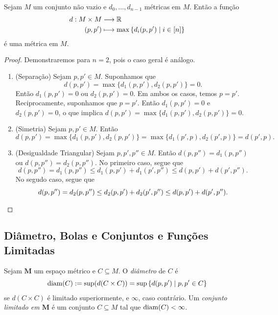 \begin{prop}
Sejam $M$ um conjunto não vazio e $d_0, \ldots,d_{n-1}$ métricas em $M$. Então a função
	\begin{align*}
	{d}: {M \times M} &\longrightarrow {\mathbb{R}} \\{(p,p')} &\longmapsto {\max\left\{d_i(p,p') \;\middle\vert\; i \in [n] \right\}}
	\end{align*}
é uma métrica em $M$.
\end{prop}
\begin{proof}
Demonstraremos para $n=2$, pois o caso geral é análogo.
	\begin{enumerate}
	\item (Separação) Sejam $p,p' \in M$. Suponhamos que
	\begin{equation*}
	d(p,p')=\max\{d_1(p,p'),d_2(p,p')\}=0.
	\end{equation*}
Então $d_1(p,p')=0$ ou $d_2(p,p')=0$. Em ambos os casos, temos $p=p'$. Reciprocamente, suponhamos que $p=p'$. Então $d_1(p,p')=0$ e $d_2(p,p')=0$, o que implica $d(p,p')=\max\{d_1(p,p'),d_2(p,p')\}=0$.
	
	\item (Simetria) Sejam $p,p' \in M$. Então
	\begin{equation*}
	d(p,p') = \max\{d_1(p,p'),d_2(p,p')\} = \max\{d_1(p',p),d_2(p',p)\} = d(p',p).
	\end{equation*}
	
	\item (Desigualdade Triangular) Sejam $p,p',p'' \in M$. Então $d(p,p'')=d_1(p,p'')$ ou $d(p,p'')=d_2(p,p'')$. No primeiro caso, segue que
	\begin{equation*}
	d(p,p'') = d_1(p,p'') \leq d_1(p,p') + d_1(p',p'') \leq d(p,p') + d(p',p'').
	\end{equation*}
	No segudo caso, segue que
	\begin{equation*}
	d(p,p'') = d_2(p,p'') \leq d_2(p,p') + d_2(p',p'') \leq d(p,p') + d(p',p''). \qedhere
	\end{equation*}
	\end{enumerate}
\end{proof}

\subsection{Diâmetro, Bolas e Conjuntos e Funções Limitadas}

\begin{defi}
Sejam $\bm M$ um espaço métrico e $C \subseteq M$. O \emph{diâmetro} de $C$ é
	\begin{equation*}
	\operatorname{diam}(C) := \sup(d(C \times C)) = \sup\left\{d(p,p') \;\middle\vert\; p,p' \in C \right\}
	\end{equation*}
se $d(C \times C)$ é limitado superiormente, e $\infty$, caso contrário. Um \emph{conjunto limitado em $\bm M$} é um conjunto $C \subseteq M$ tal que $\operatorname{diam}(C) < \infty$.
\end{defi}


